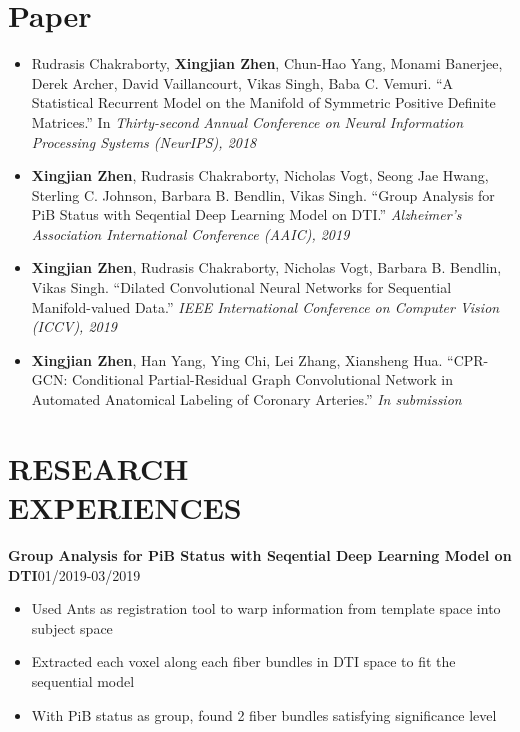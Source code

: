\documentclass[margin]{res}
\begin{document}
\begin{resume}
\section{Paper}
                \begin{itemize}\itemsep -2.2pt
                \item Rudrasis Chakraborty, \textbf{Xingjian Zhen}, Chun-Hao Yang, Monami Banerjee, Derek Archer, David Vaillancourt, Vikas Singh, Baba C. Vemuri. ``A Statistical Recurrent Model on the Manifold of Symmetric Positive Definite Matrices.''  In \emph{Thirty-second Annual Conference on Neural Information Processing Systems (NeurIPS), 2018}
                \item \textbf{Xingjian Zhen}, Rudrasis Chakraborty, Nicholas Vogt, Seong Jae Hwang, Sterling C. Johnson, Barbara B. Bendlin, Vikas Singh. ``Group Analysis for PiB Status with Seqential Deep Learning Model on DTI.'' \emph{Alzheimer's Association International Conference (AAIC), 2019}
                \item \textbf{Xingjian Zhen}, Rudrasis Chakraborty, Nicholas Vogt, Barbara B. Bendlin, Vikas Singh. ``Dilated Convolutional Neural Networks for Sequential Manifold-valued Data.'' \emph{IEEE International Conference on Computer Vision (ICCV), 2019}
                \item \textbf{Xingjian Zhen}, Han Yang, Ying Chi, Lei Zhang, Xiansheng Hua. ``CPR-GCN: Conditional Partial-Residual Graph Convolutional Network in Automated Anatomical Labeling of Coronary Arteries.'' \emph{In submission} 
                \end{itemize}

\section{RESEARCH \\ EXPERIENCES}

                \textbf{Group Analysis for PiB Status with Seqential Deep Learning Model on DTI}\hfill 01/2019-03/2019
                \begin{itemize}\itemsep -2.2pt %
                 \item Used Ants as registration tool to warp information from template space into subject space 
                 \item Extracted each voxel along each fiber bundles in DTI space to fit the sequential model
                 \item With PiB status as group, found 2 fiber bundles satisfying significance level
                 \end{itemize}


\end{resume}
\end{document}
